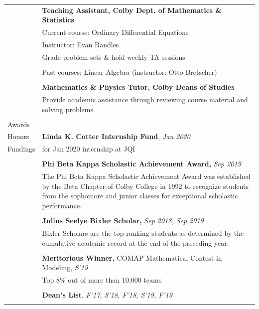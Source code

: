 \documentclass[10pt]{article}
\begin{document}
\begin{longtable}{ l m{13.5cm}   }
     					& \textbf{Teaching Assistant, Colby Dept. of Mathematics \& Statistics} \\
     					& Current course: Ordinary Differential Equations\\
     					& Instructor: Evan Randles \\
     					& Grade problem sets \& hold weekly TA sessions \\ \vspace{-9pt}
     					& \\ 
     					& Past courses: Linear Algebra (instructor: Otto Bretscher)\\
     					& \\
     					 
     					& \textbf{Mathematics \& Physics Tutor, Colby Deans of Studies} \\
     					& Provide academic assistance through reviewing course material and solving problems \\
     					& \\
     					 
     					 
     					 
  \large{Awards}    	& \\
  \large{Honors}		& \textbf{Linda K. Cotter Internship Fund}, \textit{Jan 2020}\\
  \large{Fundings}		& for Jan 2020 internship at JQI\\
  						&\\
						& \textbf{Phi Beta Kappa Scholastic Achievement Award,} \textit{Sep 2019}\\
  						& The Phi Beta Kappa Scholastic Achievement Award was established by the Beta Chapter of Colby College in 1992 to recognize students from the sophomore and junior classes for exceptional scholastic performance.\\
  						&\\
     				 	& \textbf{Julius Seelye Bixler Scholar,} \textit{Sep 2018, Sep 2019}\\
     				 	& Bixler Scholars are the top-ranking students as determined by the cumulative academic record at the end of the preceding year.\\
     				 	&\\
     				 	& \textbf{Meritorious Winner,}  COMAP Mathematical Contest in Modeling, \textit{S'19}\\
     				 	& Top 8\% out of more than 10,000 teams\\
     				 	&\\
     				 	& \textbf{Dean’s List}, \textit{F'17, S'18, F'18, S'19, F'19}\\
     				 	&\\
     				 	 

\end{longtable}
\end{document}
